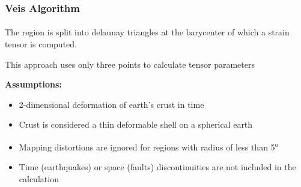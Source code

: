 \begin{frame}
  \frametitle{Veis Algorithm}
  \framesubtitle{}
  \label{ch2:}
  
  The region is split into delaunay triangles at the barycenter of which a strain tensor is computed.
  
  This approach uses only three points to calculate tensor parameters
  
  \textbf{Assumptions:}
  \begin{itemize}
    \item 2-dimensional deformation of earth's crust in time
    \item Crust is considered a thin deformable shell on a spherical earth
    \item Mapping distortions are ignored for regions with radius of less than 5\textsuperscript{o}
    \item Time (earthquakes) or space (faults) discontinuities are not included in the calculation
  \end{itemize}
\end{frame}
\note{}

\note{}



